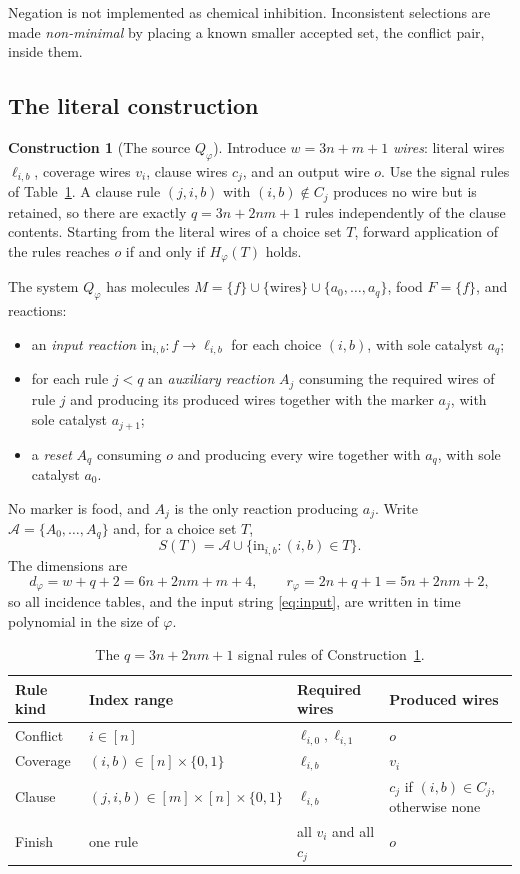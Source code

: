 \documentclass[11pt,a4paper]{article}
\theoremstyle{plain}
\theoremstyle{definition}
\newtheorem{construction}[theorem]{Construction}
\theoremstyle{remark}
\newcommand{\cA}{\mathcal A}
\begin{document}
Negation is not implemented as chemical inhibition. Inconsistent selections are made \emph{non-minimal} by placing a known smaller accepted set, the conflict pair, inside them.

\subsection{The literal construction}

\begin{construction}[The source $Q_\varphi$]\label{con:source}
Introduce $w=3n+m+1$ \emph{wires}: literal wires $\ell_{i,b}$, coverage wires $v_i$, clause wires $c_j$, and an output wire $o$. Use the signal rules of Table~\ref{tab:rules}. A clause rule $(j,i,b)$ with $(i,b)\notin C_j$ produces no wire but is retained, so there are exactly $q=3n+2nm+1$ rules independently of the clause contents. Starting from the literal wires of a choice set $T$, forward application of the rules reaches $o$ if and only if $H_\varphi(T)$ holds.

The system $Q_\varphi$ has molecules $M=\{f\}\cup\{\text{wires}\}\cup\{a_0,\dots,a_q\}$, food $F=\{f\}$, and reactions:
\begin{itemize}
\item an \emph{input reaction} $\mathrm{in}_{i,b}\colon f\to\ell_{i,b}$ for each choice $(i,b)$, with sole catalyst $a_q$;
\item for each rule $j<q$ an \emph{auxiliary reaction} $A_j$ consuming the required wires of rule $j$ and producing its produced wires together with the marker $a_j$, with sole catalyst $a_{j+1}$;
\item a \emph{reset} $A_q$ consuming $o$ and producing every wire together with $a_q$, with sole catalyst $a_0$.
\end{itemize}
No marker is food, and $A_j$ is the only reaction producing $a_j$. Write $\cA=\{A_0,\dots,A_q\}$ and, for a choice set $T$,
\[
 S(T)=\cA\cup\{\mathrm{in}_{i,b}:(i,b)\in T\}.
\]
The dimensions are
\begin{equation}\label{eq:dims}
 d_\varphi=w+q+2=6n+2nm+m+4,\qquad r_\varphi=2n+q+1=5n+2nm+2 ,
\end{equation}
so all incidence tables, and the input string \eqref{eq:input}, are written in time polynomial in the size of $\varphi$.
\end{construction}

\begin{table}[t]
\centering
\begin{tabular}{llll}
\toprule
Rule kind & Index range & Required wires & Produced wires\\
\midrule
Conflict & $i\in[n]$ & $\ell_{i,0},\ell_{i,1}$ & $o$\\
Coverage & $(i,b)\in[n]\times\{0,1\}$ & $\ell_{i,b}$ & $v_i$\\
Clause & $(j,i,b)\in[m]\times[n]\times\{0,1\}$ & $\ell_{i,b}$ & $c_j$ if $(i,b)\in C_j$, otherwise none\\
Finish & one rule & all $v_i$ and all $c_j$ & $o$\\
\bottomrule
\end{tabular}
\caption{The $q=3n+2nm+1$ signal rules of Construction~\ref{con:source}.}
\label{tab:rules}
\end{table}
\end{document}

